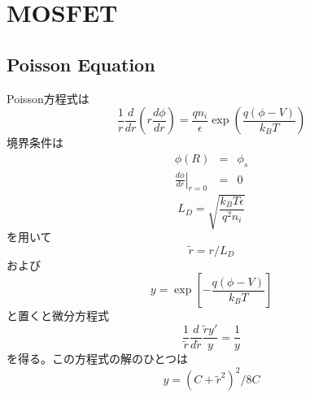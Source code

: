 \documentclass[11pt,uplatex]{jsarticle}
\def\d#1#2{\frac{d #1}{d #2}}
\begin{document}
\section{MOSFET}
\subsection{Poisson Equation}
Poisson方程式は
\begin{equation}
 \frac{1}{r} \d{}{r}(r\d{\phi}{r}) =  \frac{q n_i}{\epsilon} \exp\left(\frac{q(\phi-V)}{k_B T}\right)
\end{equation}
境界条件は
\begin{eqnarray}
 \phi(R)&=&\phi_s \\
\left. \d{\phi}{r}\right|_{r=0}&=&0
 \end{eqnarray}
\begin{equation}
 L_D = \sqrt{\frac{k_B T \epsilon}{q^2 n_i}}
\end{equation}
を用いて
\begin{equation}
 \tilde{r}=r/L_D
\end{equation}
および
\begin{equation}
 y=\exp\left[ -\frac{q(\phi-V)}{k_B T} \right]
\end{equation}
と置くと微分方程式
\begin{equation}
\frac{1}{\tilde{r}} \d{}{\tilde{r}}\frac{\tilde{r}y'}{y} = \frac{1}{y}
\end{equation}
を得る。この方程式の解のひとつは
\begin{equation}
 y=(C + \tilde{r}^2)^2/8C
\end{equation}
\end{document}
